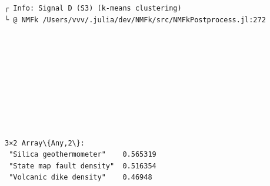 \documentclass[11pt]{article}
\begin{document}
    \begin{Verbatim}[commandchars=\\\{\}]
┌ Info: Signal D (S3) (k-means clustering)
└ @ NMFk /Users/vvv/.julia/dev/NMFk/src/NMFkPostprocess.jl:272
    \end{Verbatim}

    \begin{center}
    \end{center}
    { \hspace*{\fill} \\}
    
    \begin{Verbatim}[commandchars=\\\{\}]

    \end{Verbatim}

    \begin{center}
    \end{center}
    { \hspace*{\fill} \\}
    
    \begin{center}
    \end{center}
    { \hspace*{\fill} \\}
    
    \begin{Verbatim}[commandchars=\\\{\}]

    \end{Verbatim}

    \begin{center}
    \end{center}
    { \hspace*{\fill} \\}
    
    \begin{Verbatim}[commandchars=\\\{\}]

    \end{Verbatim}

    
    \begin{Verbatim}[commandchars=\\\{\}]
3×2 Array\{Any,2\}:
 "Silica geothermometer"    0.565319
 "State map fault density"  0.516354
 "Volcanic dike density"    0.46948
    \end{Verbatim}
\end{document}

